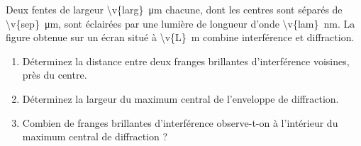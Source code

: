Deux fentes de largeur \qty{\v{larg}}{\micro\metre} chacune, dont les centres sont séparés de \qty{\v{sep}}{\micro\metre}, sont éclairées par une lumière de longueur d'onde \qty{\v{lam}}{nm}. La figure obtenue sur un écran situé à \qty{\v{L}}{m} combine interférence et diffraction.

\begin{enumerate}[label=\alph*)]
    \item Déterminez la distance entre deux franges brillantes d'interférence voisines, près du centre.
    \item Déterminez la largeur du maximum central de l'enveloppe de diffraction.
    \item Combien de franges brillantes d'interférence observe-t-on à l'intérieur du maximum central de diffraction ?
\end{enumerate}
